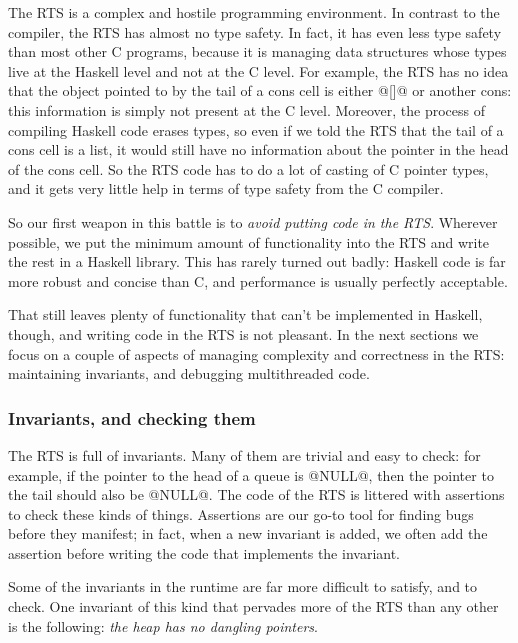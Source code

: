 \documentclass{article}
\begin{document}
The RTS is a complex and hostile programming environment.  In contrast
to the compiler, the RTS has almost no type safety.  In fact, it has
even less type safety than most other C programs, because it is
managing data structures whose types live at the Haskell level and not
at the C level.  For example, the RTS has no idea that the object
pointed to by the tail of a cons cell is either @[]@ or another cons:
this information is simply not present at the C level.  Moreover, the
process of compiling Haskell code erases types, so even if we told the
RTS that the tail of a cons cell is a list, it would still have no
information about the pointer in the head of the cons cell.  So the
RTS code has to do a lot of casting of C pointer types, and it gets
very little help in terms of type safety from the C compiler.

So our first weapon in this battle is to \emph{avoid putting code in
  the RTS}.  Wherever possible, we put the minimum amount of
functionality into the RTS and write the rest in a Haskell library.
This has rarely turned out badly: Haskell code is far more robust and
concise than C, and performance is usually perfectly acceptable.

That still leaves plenty of functionality that can't be implemented in
Haskell, though, and writing code in the RTS is not pleasant.  In the
next sections we focus on a couple of aspects of managing complexity
and correctness in the RTS: maintaining invariants, and debugging
multithreaded code.

\subsubsection{Invariants, and checking them}

The RTS is full of invariants.  Many of them are trivial and easy to
check: for example, if the pointer to the head of a queue is @NULL@,
then the pointer to the tail should also be @NULL@.  The code of the
RTS is littered with assertions to check these kinds of things.
Assertions are our go-to tool for finding bugs before they manifest;
in fact, when a new invariant is added, we often add the assertion
before writing the code that implements the invariant.

Some of the invariants in the runtime are far more difficult to
satisfy, and to check.  One invariant of this kind that pervades more
of the RTS than any other is the following: \emph{the heap has no
  dangling pointers}.
\end{document}
